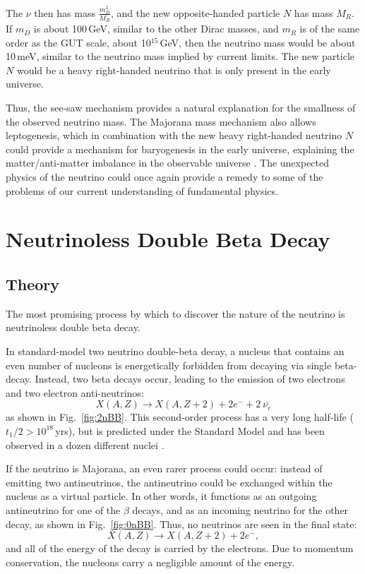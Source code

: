 The $\nu$ then has mass $\frac{m_D^2}{M_R}$, and the new opposite-handed particle $N$ has mass ${M_R}$. If $m_D$ is about 100\,GeV, similar to the other Dirac masses, and $m_R$ is of the same order as the GUT scale, about 10$^{15}$\,GeV, then the neutrino mass would be about 10\,meV, similar to the neutrino mass implied by current limits. The new particle $N$ would be a heavy right-handed neutrino that is only present in the early universe. 

Thus, the see-saw mechanism provides a natural explanation for the smallness of the observed neutrino mass. The Majorana mass mechanism also allows leptogenesis, which in combination with the new heavy right-handed neutrino $N$ could provide a mechanism for baryogenesis in the early universe, explaining the matter/anti-matter imbalance in the observable universe \cite{DiBari2012}. The unexpected physics of the neutrino could once again provide a remedy to some of the problems of our current understanding of fundamental physics. 
	
\section{Neutrinoless Double Beta Decay}
\subsection{\nonubb Theory}
The most promising process by which to discover the nature of the neutrino is neutrinoless double beta decay. 

In standard-model two neutrino double-beta decay, a nucleus that contains an even number of nucleons is energetically forbidden from decaying via single beta-decay. Instead, two beta decays occur, leading to the emission of two electrons and two electron anti-neutrinos:
$$X(A, Z) \rightarrow X(A, Z+2) + 2 e^{-} + 2 ~\overline{\nu_e}$$
as shown in Fig.~\ref{fig:2nBB}. This second-order process has a very long half-life  ($t_1/2 > 10^{18}$\,yrs), but is predicted under the Standard Model and has been observed in a dozen different nuclei \cite{Barabash2010}. 

If the neutrino is Majorana, an even rarer process could occur: instead of emitting two antineutrinos, the antineutrino could be exchanged within the nucleus as a virtual particle. In other words, it functions as an outgoing antineutrino for one of the $\beta$ decays, and as an incoming neutrino for the other decay, as shown in Fig.~\ref{fig:0nBB}. Thus, no neutrinos are seen in the final state:
$$X(A, Z) \rightarrow X(A, Z+2) + 2 e^{-},$$
and all of the energy of the decay is carried by the electrons. Due to momentum conservation, the nucleons carry a negligible amount of the energy. 


